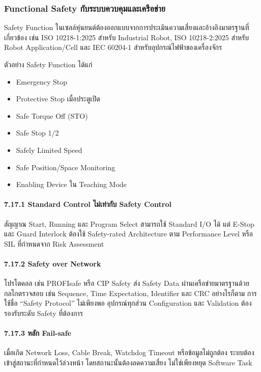 \subsubsection{Functional Safety กับระบบควบคุมและเครือข่าย}

Safety Function ในเซลล์หุ่นยนต์ต้องออกแบบจากการประเมินความเสี่ยงและอ้างอิงมาตรฐานที่เกี่ยวข้อง เช่น ISO 10218-1:2025 สำหรับ Industrial Robot, ISO 10218-2:2025 สำหรับ Robot Application/Cell และ IEC 60204-1 สำหรับอุปกรณ์ไฟฟ้าของเครื่องจักร

ตัวอย่าง Safety Function ได้แก่

\begin{itemize}
    \item Emergency Stop
    \item Protective Stop เมื่อประตูเปิด
    \item Safe Torque Off (STO)
    \item Safe Stop 1/2
    \item Safely Limited Speed
    \item Safe Position/Space Monitoring
    \item Enabling Device ใน Teaching Mode
\end{itemize}

\paragraph{7.17.1 Standard Control ไม่เท่ากับ Safety Control}

สัญญาณ Start, Running และ Program Select สามารถใช้ Standard I/O ได้ แต่ E-Stop และ Guard Interlock ต้องใช้ Safety-rated Architecture ตาม Performance Level หรือ SIL ที่กำหนดจาก Risk Assessment

\paragraph{7.17.2 Safety over Network}

โปรโตคอล เช่น PROFIsafe หรือ CIP Safety ส่ง Safety Data ผ่านเครือข่ายมาตรฐานด้วยกลไกตรวจสอบ เช่น Sequence, Time Expectation, Identifier และ CRC อย่างไรก็ตาม การใช้ชื่อ “Safety Protocol” ไม่เพียงพอ อุปกรณ์ทุกส่วน Configuration และ Validation ต้องรองรับระดับ Safety ที่ต้องการ

\paragraph{7.17.3 หลัก Fail-safe}

เมื่อเกิด Network Loss, Cable Break, Watchdog Timeout หรือข้อมูลไม่ถูกต้อง ระบบต้องเข้าสู่สถานะที่กำหนดไว้ล่วงหน้า โดยสถานะนั้นต้องลดความเสี่ยง ไม่ใช่เพียงหยุด Software Task



